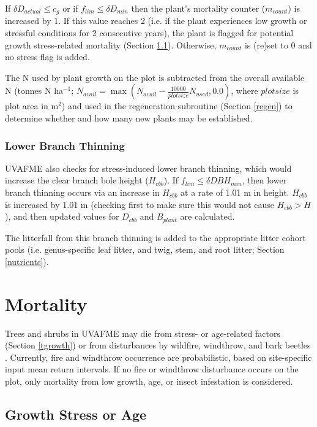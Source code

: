 \documentclass[a4paper, 12pt] {report}
\begin{document}
If $\delta D_{actual} \leq c_{g}$ or if $f_{lim} \leq \delta D_{min}$ then the plant's mortality counter ($m_{count}$) is increased by 1.  If this value reaches 2 (i.e. if the plant experiences low growth or stressful conditions for 2 consecutive years), the plant is flagged for potential growth stress-related mortality (Section \ref{stress}). Otherwise, $m_{count}$ is (re)set to 0 and no stress flag is added.

The N used by plant growth on the plot is subtracted from the overall available N (tonnes N ha$^{-1}$; $N_{avail} = \max(N_{avail} - \frac{10000}{plotsize}N_{used}, 0.0)$, where $plotsize$ is plot area in m$^2$) and used in the regeneration subroutine (Section \ref{regen}) to determine whether and how many new plants may be established.

\subsubsection{Lower Branch Thinning} \label{thinning}

UVAFME also checks for stress-induced lower branch thinning, which would increase the clear branch bole height ($H_{cbb}$). If $f_{lim} \leq \delta DBH_{min}$, then lower branch thinning occurs via an increase in $H_{cbb}$ at a rate of 1.01 m in height. $H_{cbb}$ is increased by 1.01 m (checking first to make sure this would not cause $H_{cbb} > H$), and then updated values for $D_{cbb}$ and $B_{plant}$ are calculated. 

The litterfall from this branch thinning is added to the appropriate litter cohort pools (i.e. genus-specific leaf litter, and twig, stem, and root litter; Section \ref{nutrients}). 

\section{Mortality} \label{mortality}
Trees and shrubs in UVAFME may die from stress- or age-related factors (Section \ref{tgrowth}) or from disturbances by wildfire, windthrow, and bark beetles \cite{fosterModelingInteractiveEffects2018, shumanFireDisturbanceClimate2017, fosterValidationApplicationForest2017}. Currently, fire and windthrow occurrence are probabilistic, based on site-specific input mean return intervals. If no fire or windthrow disturbance occurs on the plot, only mortality from low growth, age, or insect infestation is considered. 

\subsection{Growth Stress or Age} \label{stress}
\end{document}
